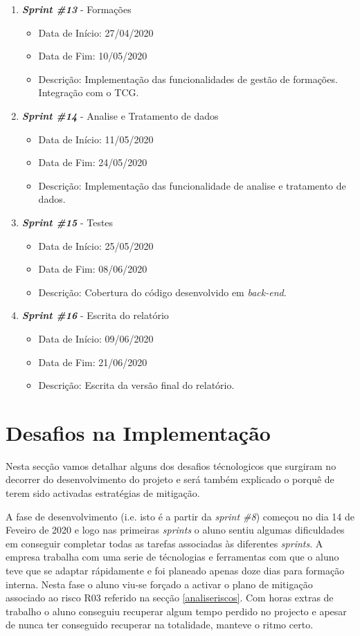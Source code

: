 \begin{enumerate}
\begin{itemize}
	\end{itemize}
	\item \textit{\textbf{Sprint \#13}} - Formações
	\begin{itemize}
		\item Data de Início: 27/04/2020
		\item Data de Fim: 10/05/2020
		\item Descrição: Implementação das funcionalidades de gestão de formações. Integração com o TCG.
	\end{itemize}
	\item \textit{\textbf{Sprint \#14}} - Analise e Tratamento de dados
	\begin{itemize}
		\item Data de Início: 11/05/2020
		\item Data de Fim: 24/05/2020
		\item Descrição: Implementação das funcionalidade de analise e tratamento de dados. 
	\end{itemize}
	\item \textit{\textbf{Sprint \#15}} - Testes
	\begin{itemize}
		\item Data de Início: 25/05/2020
		\item Data de Fim: 08/06/2020
		\item Descrição: Cobertura do código desenvolvido em \textit{back-end}.
	\end{itemize}
	\item \textit{\textbf{Sprint \#16}} - Escrita do relatório
	\begin{itemize}
		\item Data de Início: 09/06/2020
		\item Data de Fim: 21/06/2020
		\item Descrição: Escrita da versão final do relatório.
	\end{itemize}
\end{enumerate}


\section{Desafios na Implementação}
\label{sec:dificuldades}

Nesta secção vamos detalhar alguns dos desafios técnologicos que surgiram no decorrer do desenvolvimento do projeto e será também explicado o porquê de terem sido activadas estratégias de mitigação.

A fase de desenvolvimento (i.e. isto é a partir da \textit{sprint \#8}) começou no dia 14 de Feveiro de 2020 e logo nas primeiras \textit{sprints} o aluno sentiu algumas dificuldades em conseguir completar todas as tarefas associadas às diferentes \textit{sprints}. A empresa trabalha com uma serie de técnologias e ferramentas com que o aluno teve que se adaptar rápidamente e foi planeado apenas doze dias para formação interna. Nesta fase o aluno viu-se forçado a activar o plano de mitigação associado ao risco R03 referido na secção \ref{analiseriscos}. Com horas extras de trabalho o aluno conseguiu recuperar algum tempo perdido no projecto e apesar de nunca ter conseguido recuperar na totalidade, manteve o ritmo certo.

